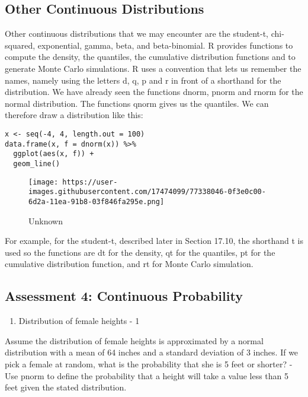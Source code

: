 \documentclass[
]{article}
\providecommand{\tightlist}{%
  \setlength{\itemsep}{0pt}\setlength{\parskip}{0pt}}
\begin{document}
\hypertarget{other-continuous-distributions}{%
\subsection{Other Continuous
Distributions}\label{other-continuous-distributions}}

Other continuous distributions that we may encounter are the student-t,
chi-squared, exponential, gamma, beta, and beta-binomial. R provides
functions to compute the density, the quantiles, the cumulative
distribution functions and to generate Monte Carlo simulations. R uses a
convention that lets us remember the names, namely using the letters d,
q, p and r in front of a shorthand for the distribution. We have already
seen the functions dnorm, pnorm and rnorm for the normal distribution.
The functions qnorm gives us the quantiles. We can therefore draw a
distribution like this:

\begin{verbatim}
x <- seq(-4, 4, length.out = 100)
data.frame(x, f = dnorm(x)) %>% 
  ggplot(aes(x, f)) + 
  geom_line()
\end{verbatim}

\begin{figure}
\centering
\texttt{[image: https://user-images.githubusercontent.com/17474099/77338046-0f3e0c00-6d2a-11ea-91b8-03f846fa295e.png]}
\caption{Unknown}
\end{figure}

For example, for the student-t, described later in Section 17.10, the
shorthand t is used so the functions are dt for the density, qt for the
quantiles, pt for the cumulative distribution function, and rt for Monte
Carlo simulation.

\hypertarget{assessment-4-continuous-probability}{%
\subsection{Assessment 4: Continuous
Probability}\label{assessment-4-continuous-probability}}

\begin{enumerate}
\def\labelenumi{\arabic{enumi}.}
\tightlist
\item
  Distribution of female heights - 1
\end{enumerate}

Assume the distribution of female heights is approximated by a normal
distribution with a mean of 64 inches and a standard deviation of 3
inches. If we pick a female at random, what is the probability that she
is 5 feet or shorter? - Use pnorm to define the probability that a
height will take a value less than 5 feet given the stated distribution.
\end{document}
